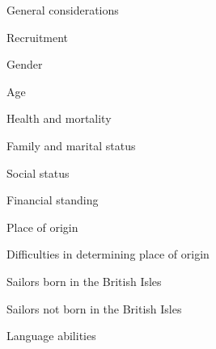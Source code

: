 \setcounter{listWWNumvileveli}{2}
\begin{listWWNumvileveli}
\item 

\setcounter{listWWNumvilevelii}{0}
\begin{listWWNumvilevelii}
\item 
\begin{styleNormali}
General considerations 
\end{styleNormali}
\item 
\begin{styleNormali}
Recruitment 
\end{styleNormali}
\item 
\begin{styleNormali}
Gender 
\end{styleNormali}
\item 
\begin{styleNormali}
Age 
\end{styleNormali}
\item 
\begin{styleNormali}
Health and mortality 
\end{styleNormali}
\item 
\begin{styleNormali}
Family and marital status 
\end{styleNormali}
\item 
\begin{styleNormali}
Social status 
\end{styleNormali}
\item 
\begin{styleNormali}
Financial standing 
\end{styleNormali}
\item 
\begin{styleNormali}
Place of origin 
\end{styleNormali}


\setcounter{listWWNumvileveliii}{0}
\begin{listWWNumvileveliii}
\item 
\begin{styleNormali}
Difficulties in determining place of origin
\end{styleNormali}
\item 
\begin{styleNormali}
Sailors born in the British Isles 
\end{styleNormali}
\item 
\begin{styleNormali}
Sailors not born in the British Isles 
\end{styleNormali}
\end{listWWNumvileveliii}
\item 
\begin{styleListParagraph}
Language abilities
\end{styleListParagraph}



\end{listWWNumvilevelii}
\end{listWWNumvileveli}
